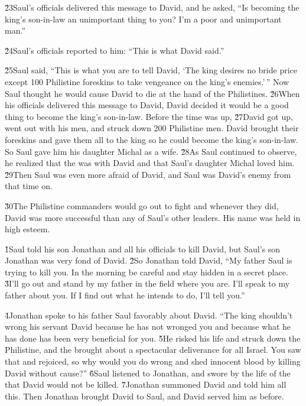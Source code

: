 \v{23}Saul's officials delivered this message to David, and he asked, ``Is becoming the king's son-in-law an unimportant thing to you? I'm a poor and unimportant man.''

\v{24}Saul's officials reported to him: ``This is what David said.''

\v{25}Saul said, ``This is what you are to tell David, `The king desires no bride price except 100 Philistine foreskins to take vengeance on the king's enemies.'\,'' Now Saul thought he would cause David to die at the hand of the Philistines. \v{26}When his officials delivered this message to David, David decided it would be a good thing to become the king's son-in-law. Before the time was up, \v{27}David got up, went out with his men, and struck down 200 Philistine men. David brought their foreskins and gave them all to the king so he could become the king's son-in-law. So Saul gave him his daughter Michal as a wife. \v{28}As Saul continued to observe, he realized that the  was with David and that Saul's daughter Michal loved him. \v{29}Then Saul was even more afraid of David, and Saul was David's enemy from that time on.

\v{30}The Philistine commanders would go out to fight and whenever they did, David was more successful than any of Saul's other leaders. His name was held in high esteem.

\v{1}Saul told his son Jonathan and all his officials to kill David, but Saul's son Jonathan was very fond of David. \v{2}So Jonathan told David, ``My father Saul is trying to kill you. In the morning be careful and stay hidden in a secret place. \v{3}I'll go out and stand by my father in the field where you are. I'll speak to my father about you. If I find out what he intends to do, I'll tell you.''

\v{4}Jonathan spoke to his father Saul favorably about David. ``The king shouldn't wrong his servant David because he has not wronged you and because what he has done has been very beneficial for you. \v{5}He risked his life and struck down the Philistine, and the  brought about a spectacular deliverance for all Israel. You saw that and rejoiced, so why would you do wrong and shed innocent blood by killing David without cause?'' \v{6}Saul listened to Jonathan, and swore by the life of the  that David would not be killed. \v{7}Jonathan summoned David and told him all this. Then Jonathan brought David to Saul, and David served him as before.


